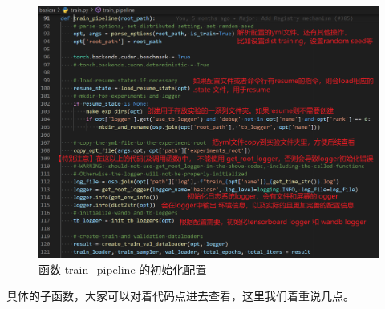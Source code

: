 \documentclass[../main.tex]{subfiles}
\begin{document}
\begin{figure}[H]
\begin{center}
    \includegraphics[width=0.7\linewidth]{figures/getting_start_2.png}
    \caption{函数 train\_pipeline 的初始化配置}
    \label{fig:getting_start_1}
\end{center}
\vspace{-0.5cm}
\end{figure}

具体的子函数，大家可以对着代码点进去查看，这里我们着重说几点。
\end{document}
